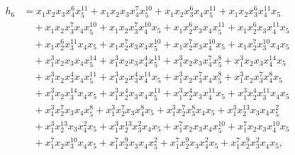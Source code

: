 \documentclass[reqno]{amsart}
\theoremstyle{plain}
\theoremstyle{definition}
\theoremstyle{plain}
\theoremstyle{definition}
\numberwithin{equation}{section}
\begin{document}
\begin{align*}
h_6 &= x_1x_2x_3x_4^{6}x_5^{11} + x_1x_2x_3x_4^{7}x_5^{10} + x_1x_2x_3^{6}x_4x_5^{11} + x_1x_2x_3^{6}x_4^{11}x_5\\ &\quad + x_1x_2x_3^{7}x_4x_5^{10} + x_1x_2x_3^{7}x_4^{10}x_5 + x_1x_2^{6}x_3x_4x_5^{11} + x_1x_2^{6}x_3x_4^{11}x_5\\ &\quad + x_1x_2^{6}x_3^{11}x_4x_5 + x_1x_2^{7}x_3x_4x_5^{10} + x_1x_2^{7}x_3x_4^{10}x_5 + x_1x_2^{7}x_3^{10}x_4x_5\\ &\quad + x_1^{3}x_2x_3x_4x_5^{14} + x_1^{3}x_2x_3x_4^{4}x_5^{11} + x_1^{3}x_2x_3x_4^{7}x_5^{8} + x_1^{3}x_2x_3x_4^{14}x_5\\ &\quad + x_1^{3}x_2x_3^{4}x_4x_5^{11} + x_1^{3}x_2x_3^{4}x_4^{11}x_5 + x_1^{3}x_2x_3^{7}x_4x_5^{8} + x_1^{3}x_2x_3^{7}x_4^{8}x_5\\ &\quad + x_1^{3}x_2x_3^{14}x_4x_5 + x_1^{3}x_2^{4}x_3x_4x_5^{11} + x_1^{3}x_2^{4}x_3x_4^{11}x_5 + x_1^{3}x_2^{4}x_3^{11}x_4x_5\\ &\quad + x_1^{3}x_2^{7}x_3x_4x_5^{8} + x_1^{3}x_2^{7}x_3x_4^{8}x_5 + x_1^{3}x_2^{7}x_3^{8}x_4x_5 + x_1^{3}x_2^{13}x_3x_4x_5^{2}\\ &\quad + x_1^{3}x_2^{13}x_3x_4^{2}x_5 + x_1^{3}x_2^{13}x_3^{2}x_4x_5 + x_1^{7}x_2x_3x_4x_5^{10} + x_1^{7}x_2x_3x_4^{10}x_5\\ &\quad + x_1^{7}x_2x_3^{10}x_4x_5 + x_1^{7}x_2^{9}x_3x_4x_5^{2} + x_1^{7}x_2^{9}x_3x_4^{2}x_5 + x_1^{7}x_2^{9}x_3^{2}x_4x_5,\\

\end{align*}
\end{document}
